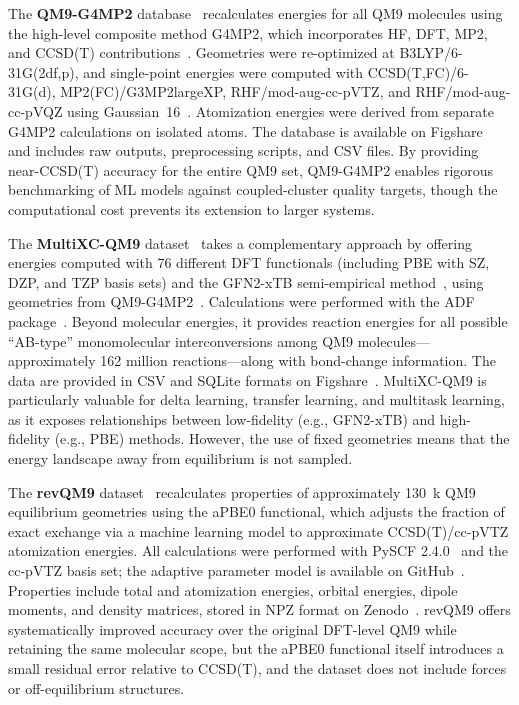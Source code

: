 \documentclass[12pt]{article}
\begin{document}
The \textbf{QM9-G4MP2} database~\cite{ds2-36} recalculates energies for all QM9 molecules using the high-level composite method G4MP2, which incorporates HF, DFT, MP2, and CCSD(T) contributions~\cite{ds2-59,ds2-61}. Geometries were re-optimized at B3LYP/6-31G(2df,p), and single-point energies were computed with CCSD(T,FC)/6-31G(d), MP2(FC)/G3MP2largeXP, RHF/mod-aug-cc-pVTZ, and RHF/mod-aug-cc-pVQZ using Gaussian~16~\cite{ds2-62}. Atomization energies were derived from separate G4MP2 calculations on isolated atoms. The database is available on Figshare~\cite{ds2-63} and includes raw outputs, preprocessing scripts, and CSV files. By providing near-CCSD(T) accuracy for the entire QM9 set, QM9-G4MP2 enables rigorous benchmarking of ML models against coupled-cluster quality targets, though the computational cost prevents its extension to larger systems.

The \textbf{MultiXC-QM9} dataset~\cite{ds3-22} takes a complementary approach by offering energies computed with 76 different DFT functionals (including PBE with SZ, DZP, and TZP basis sets) and the GFN2-xTB semi-empirical method~\cite{ds3-64}, using geometries from QM9-G4MP2~\cite{ds3-63}. Calculations were performed with the ADF package~\cite{ds3-65,ds3-66}. Beyond molecular energies, it provides reaction energies for all possible ``AB-type'' monomolecular interconversions among QM9 molecules—approximately 162 million reactions—along with bond-change information. The data are provided in CSV and SQLite formats on Figshare~\cite{ds3-67}. MultiXC-QM9 is particularly valuable for delta learning, transfer learning, and multitask learning, as it exposes relationships between low-fidelity (e.g., GFN2-xTB) and high-fidelity (e.g., PBE) methods. However, the use of fixed geometries means that the energy landscape away from equilibrium is not sampled.

The \textbf{revQM9} dataset~\cite{ds4-42} recalculates properties of approximately 130~k QM9 equilibrium geometries using the aPBE0 functional, which adjusts the fraction of exact exchange via a machine learning model to approximate CCSD(T)/cc-pVTZ atomization energies. All calculations were performed with PySCF 2.4.0~\cite{ds4-68,ds4-69,ds4-70} and the cc-pVTZ basis set; the adaptive parameter model is available on GitHub~\cite{ds4-71}. Properties include total and atomization energies, orbital energies, dipole moments, and density matrices, stored in NPZ format on Zenodo~\cite{ds4-72}. revQM9 offers systematically improved accuracy over the original DFT-level QM9 while retaining the same molecular scope, but the aPBE0 functional itself introduces a small residual error relative to CCSD(T), and the dataset does not include forces or off-equilibrium structures.
\end{document}
